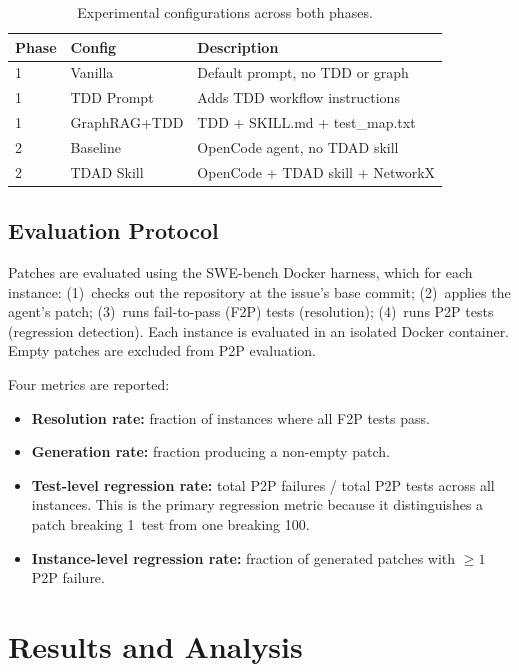 \documentclass[sigconf,nonacm]{acmart}
\begin{document}
\begin{table}[t]
\caption{Experimental configurations across both phases.}
\label{tab:configs}
\small
\begin{tabular}{@{}llp{3.8cm}@{}}
\toprule
\textbf{Phase} & \textbf{Config} & \textbf{Description} \\
\midrule
1 & Vanilla     & Default prompt, no TDD or graph \\
1 & TDD Prompt  & Adds TDD workflow instructions \\
1 & GraphRAG+TDD & TDD + SKILL.md + test\_map.txt \\
\midrule
2 & Baseline    & OpenCode agent, no TDAD skill \\
2 & TDAD Skill  & OpenCode + TDAD skill + NetworkX \\
\bottomrule
\end{tabular}
\end{table}

\subsection{Evaluation Protocol}

Patches are evaluated using the SWE-bench Docker harness, which for each
instance: (1)~checks out the repository at the issue's base commit;
(2)~applies the agent's patch; (3)~runs fail-to-pass (F2P) tests (resolution);
(4)~runs P2P tests (regression detection).  Each instance is evaluated in
an isolated Docker container.  Empty patches are excluded from P2P evaluation.

Four metrics are reported:
\begin{itemize}
  \item \textbf{Resolution rate:} fraction of instances where all F2P tests
    pass.
  \item \textbf{Generation rate:} fraction producing a non-empty patch.
  \item \textbf{Test-level regression rate:} total P2P failures / total P2P
    tests across all instances.  This is the primary regression metric because
    it distinguishes a patch breaking 1~test from one breaking 100.
  \item \textbf{Instance-level regression rate:} fraction of generated patches
    with $\geq 1$ P2P failure.
\end{itemize}


\section{Results and Analysis}
\label{sec:results}
\end{document}
